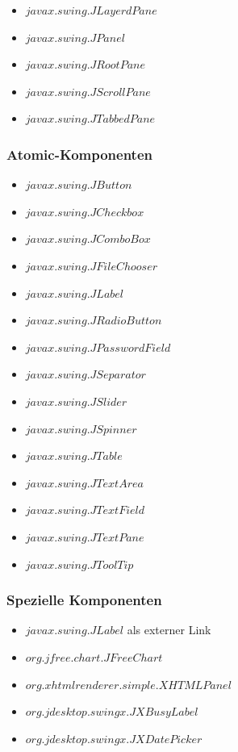   \begin{itemize}
    \item \(javax.swing.JLayerdPane\)
    \item \(javax.swing.JPanel\)
    \item \(javax.swing.JRootPane\)
    \item \(javax.swing.JScrollPane\)
    \item \(javax.swing.JTabbedPane\)
  \end{itemize}
  
  \subsubsection{Atomic-Komponenten}
  \begin{itemize}
    \item \(javax.swing.JButton\)
    \item \(javax.swing.JCheckbox\)
    \item \(javax.swing.JComboBox\)
    \item \(javax.swing.JFileChooser\)
    \item \(javax.swing.JLabel\)
    \item \(javax.swing.JRadioButton\)
    \item \(javax.swing.JPasswordField\)
    \item \(javax.swing.JSeparator\)
    \item \(javax.swing.JSlider\)
    \item \(javax.swing.JSpinner\)
    \item \(javax.swing.JTable\)
    \item \(javax.swing.JTextArea\)
    \item \(javax.swing.JTextField\)
    \item \(javax.swing.JTextPane\)
    \item \(javax.swing.JToolTip\)
  \end{itemize}
  
  \subsubsection{Spezielle Komponenten}
    
  \begin{itemize}
    \item \(javax.swing.JLabel\) als externer Link
    \item \(org.jfree.chart.JFreeChart\)
    \item \(org.xhtmlrenderer.simple.XHTMLPanel\)
    \item \(org.jdesktop.swingx.JXBusyLabel\)
    \item \(org.jdesktop.swingx.JXDatePicker\)
  \end{itemize}
    
